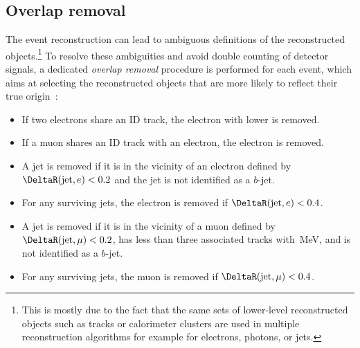 \subsection{Overlap removal}
\label{subsec:overlap-removal}

The event reconstruction can lead to ambiguous definitions of the reconstructed objects.\footnote{This is mostly due to the fact that the same sets of lower-level reconstructed objects such as tracks or calorimeter clusters are used in multiple reconstruction algorithms for example for electrons, photons, or jets.}
To resolve these ambiguities and avoid double counting of detector signals, a dedicated \emph{overlap removal} procedure is performed for each event, which aims at selecting the reconstructed objects that are more likely to reflect their true origin~\cite{HWWPaper}:
\begin{itemize}
    \item If two electrons share an ID track, the electron with lower \ET is removed.
    \item If a muon shares an ID track with an electron, the electron is removed.
    \item A jet is removed if it is in the vicinity of an electron defined by $\DeltaR(\text{jet}, e) < 0.2$ and the jet is not identified as a $b$-jet.
    \item For any surviving jets, the electron is removed if $\DeltaR(\text{jet}, e) < 0.4$.
    \item A jet is removed if it is in the vicinity of a muon defined by $\DeltaR(\text{jet}, \mu) < 0.2$, has less than three associated tracks with \,MeV, and is not identified as a $b$-jet.
    \item For any surviving jets, the muon is removed if $\DeltaR(\text{jet}, \mu) < 0.4$.
\end{itemize}

